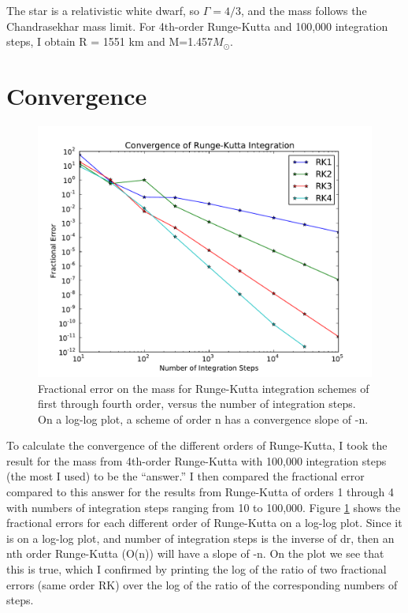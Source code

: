\documentclass{article}
\begin{document}
The star is a relativistic white dwarf, so $\Gamma = 4/3$, and the mass follows the Chandrasekhar mass limit.
For 4th-order Runge-Kutta and 100,000 integration steps, I obtain R = 1551 km and M=1.457$M_\odot$.

\section{Convergence}

\begin{figure}[h]
  \begin{center}
     \includegraphics[width=\textwidth]{rk}
  \end{center}
  \caption{Fractional error on the mass for Runge-Kutta integration schemes of first through fourth order, versus
the number of integration steps.  On a log-log plot, a scheme of order n has a convergence slope of -n.}
  \label{fig:rk}
\end{figure}

To calculate the convergence of the different orders of Runge-Kutta, I took the result for the mass from 4th-order
Runge-Kutta with 100,000 integration steps (the most I used) to be the ``answer.''  I then compared the
fractional error compared to this answer for the results from Runge-Kutta of orders 1 through 4 with 
numbers of integration steps ranging from 10 to 100,000.  Figure \ref{fig:rk} shows the fractional
errors for each different order of Runge-Kutta on a log-log plot.  Since it is on a log-log plot,
and number of integration steps is the inverse of dr, then an nth order Runge-Kutta (O(n)) will have
a slope of -n.  On the plot we see that this is true, which I confirmed by printing the log of the ratio
of two fractional errors (same order RK) over the log of the ratio of the corresponding numbers of steps.
\end{document}
